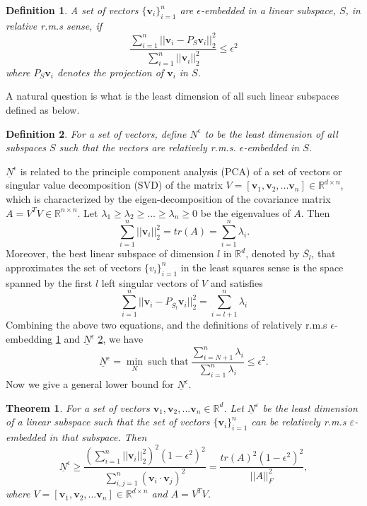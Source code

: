 \documentclass[11pt]{amsart}
\newtheorem{theorem}{Theorem}[section]
\newtheorem{definition}{Definition}[section]
\newcommand{\bv}{\mathbf{v}}
\newcommand{\eps}{\varepsilon}
\begin{document}
\begin{definition}
\label{def:eps}
A set of vectors $\{ \bv_i\}_{i=1}^n$ are $\epsilon$-embedded in a linear subspace, $S$, in relative r.m.s sense,  if 
$$\frac{\sum_{i=1}^n ||\bv_i-P_{S}\bv_i||_2^2}{\sum_{i=1}^n ||\bv_i||_2^2} \leq \epsilon^2$$ 
where $P_{S}\bv_i$ denotes the projection of $\bv_i$ in $S$.
\end{definition}
A natural question is what is the least dimension of all such linear subspaces defined as below.
\begin{definition}
\label{def:N}
For a set of vectors, define $\underline{N}^{\epsilon}$ to be the least dimension of all subspaces $S$ such that the vectors are relatively r.m.s. $\epsilon$-embedded in $S$.
\end{definition}


$\underline{N}^{\epsilon}$ is related to the principle component analysis (PCA) of a set of vectors or singular value decomposition (SVD) of the matrix $V = [\bv_1, \bv_2, ... \bv_n] \in \mathbb R^{d \times n}$, which is characterized by the eigen-decomposition of the covariance matrix $A= V^TV \in \mathbb R^{n \times n}$. Let $\lambda_1 \geq \lambda_2 \geq ... \geq \lambda_n \geq 0$ be the eigenvalues of $A$.  Then 
\begin{equation}
\sum_{i=1}^n ||\bv_i||_2^2= tr(A)  = \sum_{i=1}^n \lambda_i  .
\end{equation}
Moreover, the best linear subspace of dimension $l$ in $\mathbb{R}^d$, denoted by $\bar{S_l}$, that approximates the set of vectors $\{ v_i\}_{i=1}^n$ in the least squares sense is the space spanned by the first $l$ left singular vectors of $V$ and satisfies 
\begin{equation}\label{eq:SVD}
\sum_{i=1}^n ||\bv_i - P_{\bar{S_l}}\bv_i ||_2^2  = \sum_{i=l+1}^n \lambda_i
\end{equation}
Combining the above two equations, and the definitions of relatively r.m.s $\epsilon$-embedding \ref{def:eps} and $\underline{N}^{\epsilon}$ \ref{def:N}, we have  
\begin{equation}\label{eq:N}
\underline{N}^{\epsilon}=\min_{N} ~\mbox{such that} ~\frac{\sum_{i=N+1}^n \lambda_i}{\sum_{i=1}^n \lambda_i} \leq \epsilon^2 .
\end{equation} 
Now we give a general lower bound for $\underline{N}^{\epsilon}$. 
\begin{theorem}
\label{th:embedding}  
For a set of vectors $\bv_1, \bv_2, ... \bv_n \in \mathbb R^{d}$.  Let $\underline{N}^{\eps}$ be the least dimension of a linear subspace such that the set of vectors $\{ \bv_i\}_{i=1}^n$ can be relatively r.m.s $\eps$-embedded in that subspace.  Then
\[
\underline{N}^{\epsilon} \geq \frac{(\sum_{i=1}^n ||\bv_i||_2^2)^2 (1- \epsilon^2)^2}{\sum_{i,j=1}^n (\bv_i \cdot \bv_j)  ^2} = \frac{tr(A)^2 (1- \epsilon^2)^2}{||A||_F^2}, 
\]
where $V = [\bv_1, \bv_2, ... \bv_n] \in \mathbb R^{d \times n}$ and $A=V^TV$.
\end{theorem}
\end{document}
